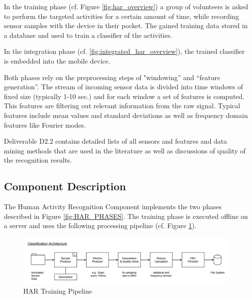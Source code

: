 In the training phase (cf. Figure \ref{fig:har_overview}) a group of
volunteers is asked to perform the targeted activities for a certain
amount of time, while recording sensor samples with the device in
their pocket.  The gained training data stored in a database and used
to train a classifier of the activities.

In the integration phase (cf. \ref{fig:integrated_har_overview}), the
trained classifier is embedded into the mobile device.

Both phases rely on the preprocessing steps of "windowing'' and
``feature generation''. The stream of incoming sensor data is divided into
time windows of fixed size (typically 1-10 sec.) and for each window
a set of features is computed. This features are filtering out
relevant information from the raw signal. Typical features include
mean values and standard deviations as well as frequency domain
features like Fourier modes.

Deliverable D2.2 contains detailed lists of all sensors and features
and data mining methods that are used in the literature as well as
discussions of quality of the recognition results.

\subsection{Component Description}\label{sec:har_component}

The Human Activity Recognition Component implements the two phases
described in Figure \ref{fig:HAR_PHASES}. The training phase is
executed offline on a server and uses the following processing
pipeline (cf. Figure \ref{fig:classification_architecture}).

\begin{figure}[htbp]
\centering
\includegraphics[width=\textwidth]{img/har/classification_architecture.png}
\caption{HAR Training Pipeline}\label{fig:classification_architecture}
\end{figure}

